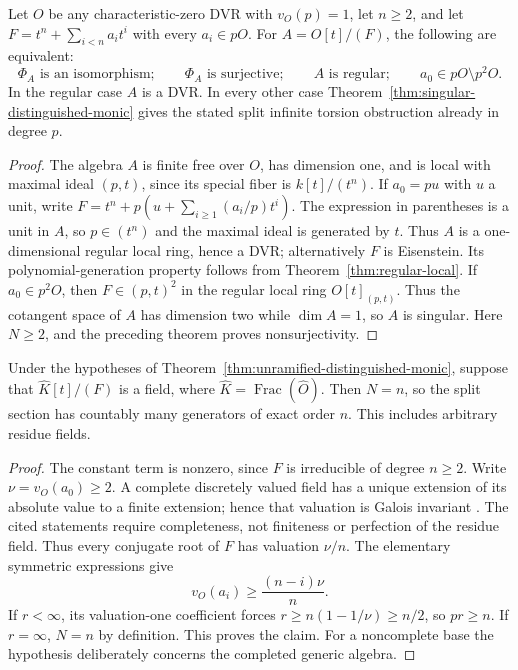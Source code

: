 \begin{corollary}\label{cor:distinguished-monic-regularity}
Let \(O\) be any characteristic-zero DVR with \(v_O(p)=1\), let \(n\ge2\), and
let \(F=t^n+\sum_{i<n}a_it^i\) with every \(a_i\in pO\).
For \(A=O[t]/(F)\), the following are equivalent:
\[
 \Phi_A\text{ is an isomorphism};\qquad\Phi_A\text{ is surjective};\qquad A\text{ is regular};\qquad
 a_0\in pO\setminus p^2O.
\]
In the regular case \(A\) is a DVR.  In every other case
Theorem~\ref{thm:singular-distinguished-monic} gives the stated
split infinite torsion obstruction already in degree \(p\).
\end{corollary}

\begin{proof}
The algebra \(A\) is finite free over \(O\), has dimension one,
and is local with maximal ideal \((p,t)\), since its special
fiber is \(k[t]/(t^n)\).  If \(a_0=pu\) with \(u\)
a unit, write
\(F=t^n+p(u+\sum_{i\ge1}(a_i/p)t^i)\).  The expression in
parentheses is a unit in \(A\), so \(p\in(t^n)\) and the maximal
ideal is generated by \(t\).  Thus \(A\) is a one-dimensional
regular local ring, hence a DVR; alternatively \(F\) is Eisenstein.
Its polynomial-generation property follows from
Theorem~\ref{thm:regular-local}.
If \(a_0\in p^2O\), then \(F\in(p,t)^2\) in the regular local
ring \(O[t]_{(p,t)}\).  Thus the cotangent space of \(A\) has
dimension two while \(\dim A=1\), so \(A\) is singular.  Here
\(N\ge2\), and the preceding theorem proves nonsurjectivity.
\end{proof}


\begin{corollary}\label{cor:unramified-monic-completed-field}\label{cor:singular-monic-generic-field-order}
Under the hypotheses of Theorem~\ref{thm:unramified-distinguished-monic},
suppose that \(\widehat K[t]/(F)\) is a field, where
\(\widehat K=\operatorname{Frac}(\widehat O)\).
Then \(N=n\), so the split section has countably many generators
of exact order \(n\).  This includes arbitrary residue fields.
\end{corollary}

\begin{proof}
The constant term is nonzero, since \(F\) is irreducible of
degree \(n\ge2\).  Write \(\nu=v_O(a_0)\ge2\).
A complete discretely valued field has a unique extension of its
absolute value to a finite extension; hence that valuation is
Galois invariant \citep[Theorem 4.7 and Corollary 4.8,
pp.~54--55]{WilliamsWuthrich2025}.  The cited statements require
completeness, not finiteness or perfection of the residue field.
Thus every conjugate root of \(F\) has valuation \(\nu/n\).
The elementary symmetric expressions give
\[
 v_O(a_i)\ge\frac{(n-i)\nu}{n}.
\]
If \(r<\infty\), its valuation-one coefficient forces
\(r\ge n(1-1/\nu)\ge n/2\), so \(pr\ge n\).
If \(r=\infty\), \(N=n\) by definition.  This proves the claim.
For a noncomplete base the hypothesis deliberately concerns the
completed generic algebra.
\end{proof}


